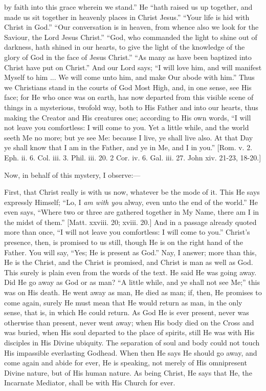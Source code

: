 by faith into this grace wherein we stand.'' He ``hath raised us
up together, and made us sit together in heavenly places in Christ
Jesus.'' ``Your life is hid with Christ in God.'' ``Our
conversation is in heaven, from whence also we look for the Saviour, the
Lord Jesus Christ.'' ``God, who commanded the light to shine out
of darkness, hath shined in our hearts, to give the light of the
knowledge of the glory of God in the face of Jesus Christ.''
``As many as have been baptized into Christ have put on
Christ.'' And our Lord says; ``I will love him, and will
manifest Myself to him ... We will come unto him, and make Our abode
with him.'' Thus we Christians stand in the courts of God Most High,
and, in one sense, see His face; for He who once was on earth, has now
departed from this visible scene of things in a mysterious, twofold way,
both to His Father and into our hearts, thus making the Creator and His
creatures one; according to His own words, ``I will not leave you
comfortless: I will come to you. Yet a little while, and the world seeth
Me no more; but ye see Me: because I live, ye shall live also. At that
Day ye shall know that I am in the Father, and ye in Me, and I in
you.'' [Rom. v. 2. Eph. ii. 6. Col. iii. 3. Phil. iii. 20. 2 Cor.
iv. 6. Gal. iii. 27. John xiv. 21-23, 18-20.]

Now, in behalf of this mystery, I observe:—

First, that Christ really is with us now, whatever be the mode of it.
This He says expressly Himself; ``Lo, I \emph{am with you} alway,
even unto the end of the world.'' He even says, ``Where two or
three are gathered together in My Name, there am I in the midst of
them.'' [Matt. xxviii. 20; xviii. 20.] And in a passage already
quoted more than once, ``I will not leave you comfortless: I will
come to you.'' Christ's presence, then, is promised to us still,
though He is on the right hand of the Father. You will say, ``Yes;
He is present as God.'' Nay, I answer; more than this, He is the
Christ, and the Christ is promised, and Christ is man as well as God.
This surely is plain even from the words of the text. He said He was
going away. Did He go away as God or as man? ``A little while, and
ye shall not see Me;'' this was on His death. He went away as man,
He died as man; if, then, He promises to come again, surely He must mean
that He would return as man, in the only sense, that is, in which He
could return. As God He is ever present, never was otherwise than
present, never went away; when His body died on the Cross and was buried,
when His soul departed to the place of spirits, still He was with His
disciples in His Divine ubiquity. The separation of soul and body could
not touch His impassible everlasting Godhead. When then He says He
should go away, and come again and abide for ever, He is speaking, not
merely of His omnipresent Divine nature, but of His human nature. As
being Christ, He says that He, the Incarnate Mediator, shall be with His
Church for ever.

